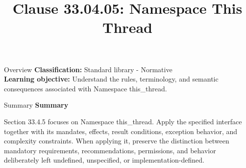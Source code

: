 \documentclass[10pt,letterpaper]{article}
\title{Clause 33.04.05: Namespace This Thread}
\author{}
\date{}
\begin{document}
\maketitle
\begin{CornellOverviewBox}{Overview}
\textbf{Classification:} Standard library - Normative\\[2pt]
\textbf{Learning objective:} Understand the rules, terminology, and semantic consequences associated with Namespace this\_thread.
\end{CornellOverviewBox}\begin{CornellSummaryBox}{Summary}
{\sffamily\bfseries\color{Accent} Summary}\par\vspace{3pt}Section 33.4.5 focuses on Namespace this\_thread. Apply the specified interface together with its mandates, effects, result conditions, exception behavior, and complexity constraints. When applying it, preserve the distinction between mandatory requirements, recommendations, permissions, and behavior deliberately left undefined, unspecified, or implementation-defined.
\end{CornellSummaryBox}
\end{document}
